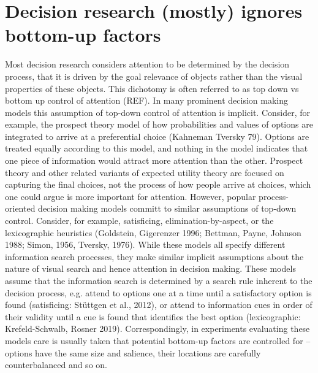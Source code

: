 \documentclass{article}
\begin{document}
\section{Decision research (mostly) ignores bottom-up factors}
Most decision research considers attention to be determined by the decision process, that it is driven by the goal relevance of objects rather than the visual properties of these objects. This dichotomy is often referred to as top down vs bottom up control of attention (REF).  In many prominent decision making models this assumption of top-down control of attention is implicit. Consider, for example, the prospect theory model of how probabilities and values of options are integrated  to arrive at a preferential choice (Kahneman Tversky 79). Options are treated equally according to this model, and nothing in the model indicates that one piece of information would attract more attention than the other. Prospect theory and other related variants of expected utility theory are focused on capturing the final choices, not the process of how people arrive at choices, which one could argue is more important for attention. However, popular process-oriented decision making models committ to similar assumptions of top-down control. Consider, for example, satisficing, elimination-by-aspect, or the lexicographic heuristics (Goldstein, Gigerenzer 1996; Bettman, Payne, Johnson 1988; Simon, 1956, Tversky, 1976). While these models all specify different information search processes, they make similar implicit assumptions about the nature of visual search and hence attention in decision making. These  models assume that the information search is determined by a search rule inherent to the decision process, e.g. attend to options one at a time until a satisfactory option is found (satisficing: Stüttgen et al., 2012), or attend to information cues in order of their validity until a cue is found that identifies the best option (lexicographic: Krefeld-Schwalb, Rosner 2019). Correspondingly, in experiments evaluating these models care is usually taken that potential bottom-up factors are controlled for – options have the same size and salience, their locations are carefully counterbalanced and so on. 
\end{document}
